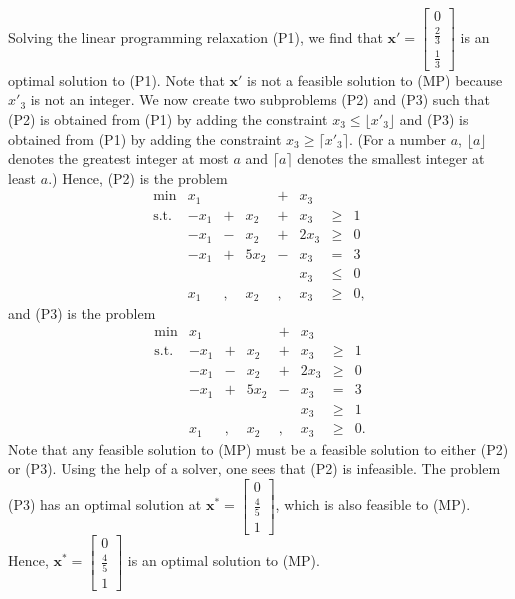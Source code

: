 \documentclass[]{book}
\renewcommand{\vec}[1]{\mathbf{#1}}
\theoremstyle{definition}
\theoremstyle{definition}
\theoremstyle{remark}
\begin{document}
Solving the linear programming relaxation (P1), we find that
\(\vec{x}' = \begin{bmatrix}0\\ \frac{2}{3}\\ \frac{1}{3}\end{bmatrix}\)
is an optimal solution to (P1). Note that \(\mathbf{x}'\) is not a
feasible solution to (MP) because \(x'_3\) is not an integer. We now
create two subproblems (P2) and (P3) such that (P2) is obtained from
(P1) by adding the constraint \(x_3 \leq \lfloor x'_3\rfloor\) and (P3)
is obtained from (P1) by adding the constraint
\(x_3 \geq \lceil x'_3\rceil\). (For a number \(a\),
\(\lfloor a \rfloor\) denotes the greatest integer at most \(a\) and
\(\lceil a \rceil\) denotes the smallest integer at least \(a\).) Hence,
(P2) is the problem \[\begin{array}{rrcrcrlll}
\min & x_1 &  &  & + & x_3  \\
\text{s.t.} & -x_1 & + &  x_2 & + &  x_3  & \geq & 1 \\
 & -x_1 & - &  x_2 & + & 2x_3  & \geq & 0 \\
 & -x_1 & + & 5x_2 & - &  x_3  & = & 3 \\
 &      &   &      &   &  x_3  & \leq & 0 \\
 &  x_1 & , & x_2 & , & x_3 & \geq & 0,
\end{array}\] and (P3) is the problem \[\begin{array}{rrcrcrlll}
\min & x_1 &  &  & + & x_3  \\
\text{s.t.} & -x_1 & + &  x_2 & + &  x_3  & \geq & 1 \\
 & -x_1 & - &  x_2 & + & 2x_3  & \geq & 0 \\
 & -x_1 & + & 5x_2 & - &  x_3  & = & 3 \\
 &      &   &      &   &  x_3  & \geq & 1 \\
 &  x_1 & , & x_2 & , & x_3 & \geq & 0.
\end{array}\] Note that any feasible solution to (MP) must be a feasible
solution to either (P2) or (P3). Using the help of a solver, one sees
that (P2) is infeasible. The problem (P3) has an optimal solution at
\(\mathbf{x}^* = \begin{bmatrix}0\\ \frac{4}{5}\\ 1\end{bmatrix}\),
which is also feasible to (MP). Hence,
\(\mathbf{x}^* = \begin{bmatrix}0\\ \frac{4}{5}\\ 1\end{bmatrix}\) is an
optimal solution to (MP).
\end{document}
